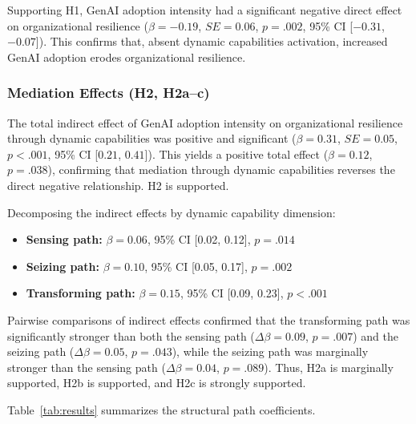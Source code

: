 \documentclass[12pt, a4paper]{article}
\begin{document}
Supporting H1, GenAI adoption intensity had a significant negative direct effect on organizational resilience ($\beta = -0.19$, $SE = 0.06$, $p = .002$, 95\% CI [$-0.31$, $-0.07$]). This confirms that, absent dynamic capabilities activation, increased GenAI adoption erodes organizational resilience.

\subsubsection{Mediation Effects (H2, H2a--c)}

The total indirect effect of GenAI adoption intensity on organizational resilience through dynamic capabilities was positive and significant ($\beta = 0.31$, $SE = 0.05$, $p < .001$, 95\% CI [$0.21$, $0.41$]). This yields a positive total effect ($\beta = 0.12$, $p = .038$), confirming that mediation through dynamic capabilities reverses the direct negative relationship. H2 is supported.

Decomposing the indirect effects by dynamic capability dimension:

\begin{itemize}[nosep]
    \item \textbf{Sensing path:} $\beta = 0.06$, 95\% CI [0.02, 0.12], $p = .014$
    \item \textbf{Seizing path:} $\beta = 0.10$, 95\% CI [0.05, 0.17], $p = .002$
    \item \textbf{Transforming path:} $\beta = 0.15$, 95\% CI [0.09, 0.23], $p < .001$
\end{itemize}

Pairwise comparisons of indirect effects confirmed that the transforming path was significantly stronger than both the sensing path ($\Delta\beta = 0.09$, $p = .007$) and the seizing path ($\Delta\beta = 0.05$, $p = .043$), while the seizing path was marginally stronger than the sensing path ($\Delta\beta = 0.04$, $p = .089$). Thus, H2a is marginally supported, H2b is supported, and H2c is strongly supported.

Table~\ref{tab:results} summarizes the structural path coefficients.
\end{document}
